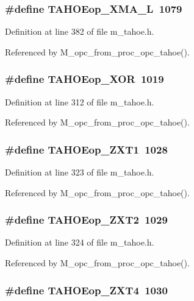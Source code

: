 \subsubsection{\setlength{\rightskip}{0pt plus 5cm}\#define TAHOEop\_\-XMA\_\-L~1079}\label{m__tahoe_8h_d80fe9fa9db34e285a600d6f6d82c169}




Definition at line 382 of file m\_\-tahoe.h.

Referenced by M\_\-opc\_\-from\_\-proc\_\-opc\_\-tahoe().
\subsubsection{\setlength{\rightskip}{0pt plus 5cm}\#define TAHOEop\_\-XOR~1019}\label{m__tahoe_8h_3a5632eb2a83217ece28f7cf8da7d824}




Definition at line 312 of file m\_\-tahoe.h.

Referenced by M\_\-opc\_\-from\_\-proc\_\-opc\_\-tahoe().
\subsubsection{\setlength{\rightskip}{0pt plus 5cm}\#define TAHOEop\_\-ZXT1~1028}\label{m__tahoe_8h_3199dfaf396432864e3429790be25345}




Definition at line 323 of file m\_\-tahoe.h.

Referenced by M\_\-opc\_\-from\_\-proc\_\-opc\_\-tahoe().
\subsubsection{\setlength{\rightskip}{0pt plus 5cm}\#define TAHOEop\_\-ZXT2~1029}\label{m__tahoe_8h_6bc3e36bdff5818c1c54a41e1caf0ec7}




Definition at line 324 of file m\_\-tahoe.h.

Referenced by M\_\-opc\_\-from\_\-proc\_\-opc\_\-tahoe().
\subsubsection{\setlength{\rightskip}{0pt plus 5cm}\#define TAHOEop\_\-ZXT4~1030}\label{m__tahoe_8h_06c8c47211ba3bc194cc6763545a0f4f}




